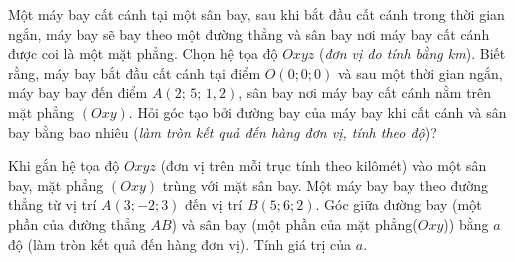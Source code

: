 \begin{bt}%
	Một máy bay cất cánh tại một sân bay, sau khi bắt đầu cất cánh trong thời gian ngắn, máy bay sẽ bay theo một đường thẳng và sân bay nơi máy bay cất cánh được coi là một mặt phẳng. Chọn hệ tọa độ $Oxyz$ (\textit{đơn vị đo tính bằng km}). Biết rằng, máy bay bắt đầu cất cánh tại điểm $O(0;0;0)$ và sau một thời gian ngắn, máy bay bay đến điểm $A(2;\,5;\,1{,}2)$, sân bay nơi máy bay cất cánh nằm trên mặt phẳng $(Oxy)$. Hỏi góc tạo bởi đường bay của máy bay  khi cất cánh và sân bay bằng bao nhiêu (\textit{làm tròn kết quả đến hàng đơn vị, tính theo độ})?
\end{bt}

\begin{bt}%
	Khi gắn  hệ tọa độ $Oxyz$ (đơn vị trên mỗi trục tính theo kilômét) vào một sân bay, mặt phẳng $(Oxy)$ trùng với mặt sân bay. Một máy bay bay theo đường thẳng từ vị trí $A(3;-2;3)$ đến vị trí $B(5;6;2)$. Góc giữa đường bay (một phần của đường thẳng $AB$) và sân bay (một phần của mặt phẳng($Oxy$)) bằng $a$ độ (làm tròn kết quả đến hàng đơn vị). Tính giá trị của $a$.
\end{bt}

